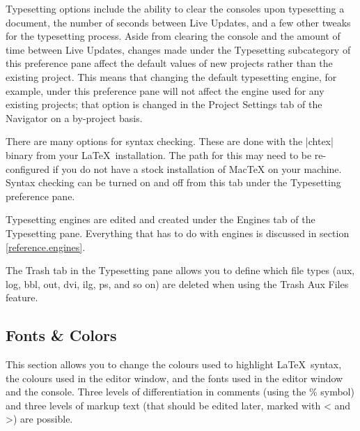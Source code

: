Typesetting options include the ability to clear the consoles upon typesetting a document, the number of seconds between Live Updates, and a few other tweaks for the typesetting process. Aside from clearing the console and the amount of time between Live Updates, changes made under the Typesetting subcategory of this preference pane affect the default values of new projects rather than the existing project. This means that changing the default typesetting engine, for example, under this preference pane will not affect the engine used for any existing projects; that option is changed in the Project Settings tab of the Navigator on a by-project basis.

There are many options for syntax checking. These are done with the |chtex| binary from your \LaTeX\ installation. The path for this may need to be re-configured if you do not have a stock installation of MacTeX on your machine. Syntax checking can be turned on and off from this tab under the Typesetting preference pane.

Typesetting engines are edited and created under the Engines tab of the Typesetting pane. Everything that has to do with engines is discussed in section \ref{reference.engines}.

The Trash tab in the Typesetting pane allows you to define which file types (aux, log, bbl, out, dvi, ilg, ps, and so on) are deleted when using the Trash Aux Files feature.

\subsection{Fonts \& Colors}
\label{reference.prefs.fontcol}
This section allows you to change the colours used to highlight \LaTeX\ syntax, the colours used in the editor window, and the fonts used in the editor window and the console. Three levels of differentiation in comments (using the \% symbol) and three levels of markup text (that should be edited later, marked with {\textless} and {\textgreater}) are possible.


